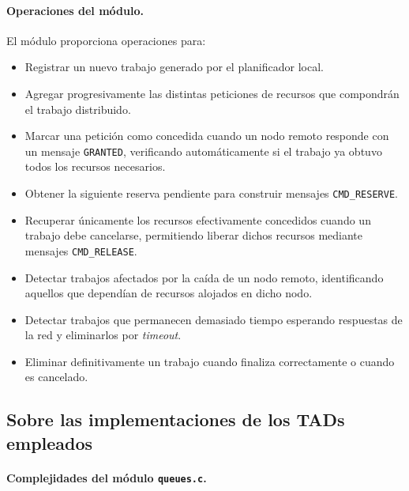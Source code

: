 \documentclass[12pt,a4paper]{article}
\begin{document}
\paragraph{Operaciones del módulo.}
El módulo proporciona operaciones para:
 
\begin{itemize}
    \item Registrar un nuevo trabajo generado por el planificador local.
    \item Agregar progresivamente las distintas peticiones de recursos que compondrán el trabajo distribuido.
    \item Marcar una petición como concedida cuando un nodo remoto responde con un mensaje \texttt{GRANTED}, verificando automáticamente si el trabajo ya obtuvo todos los recursos necesarios.
    \item Obtener la siguiente reserva pendiente para construir mensajes \texttt{CMD\_RESERVE}.
    \item Recuperar únicamente los recursos efectivamente concedidos cuando un trabajo debe cancelarse, permitiendo liberar dichos recursos mediante mensajes \texttt{CMD\_RELEASE}.
    \item Detectar trabajos afectados por la caída de un nodo remoto, identificando aquellos que dependían de recursos alojados en dicho nodo.
    \item Detectar trabajos que permanecen demasiado tiempo esperando respuestas de la red y eliminarlos por \emph{timeout}.
    \item Eliminar definitivamente un trabajo cuando finaliza correctamente o cuando es cancelado.
\end{itemize}
 
\subsection{Sobre las implementaciones de los TADs empleados}
 
\paragraph{Complejidades del módulo \texttt{queues.c}.}
 
\end{document}
